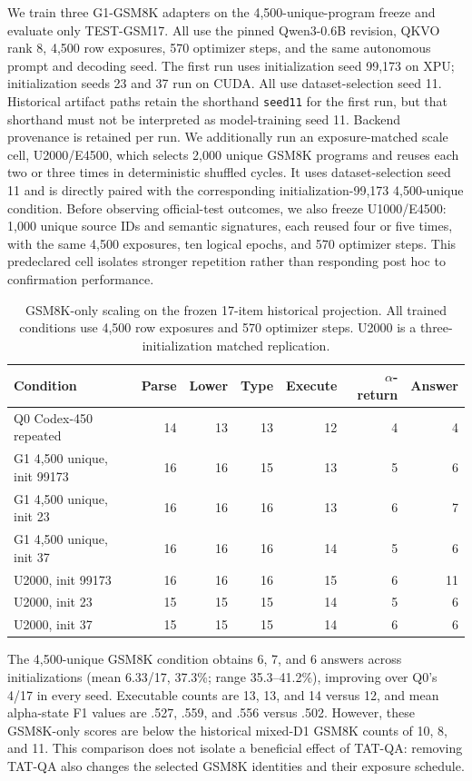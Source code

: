 \documentclass[11pt]{article}
\begin{document}
We train three G1-GSM8K adapters on the 4,500-unique-program freeze
and evaluate only TEST-GSM17. All use the pinned Qwen3-0.6B revision,
QKVO rank 8, 4,500 row exposures, 570 optimizer steps, and the same autonomous
prompt and decoding seed. The first run uses initialization seed 99,173 on XPU;
initialization seeds 23 and 37 run on CUDA. All use dataset-selection seed 11.
Historical artifact paths retain the shorthand \texttt{seed11} for the first
run, but that shorthand must not be interpreted as model-training seed 11.
Backend provenance is retained per run. We additionally run an exposure-matched
scale cell, U2000/E4500, which selects 2,000 unique GSM8K programs and
reuses each two or three times in deterministic shuffled cycles. It uses
dataset-selection seed 11 and is directly paired with the corresponding
initialization-99,173 4,500-unique condition.
Before observing official-test outcomes, we also freeze U1000/E4500: 1,000
unique source IDs and semantic signatures, each reused four or five times, with
the same 4,500 exposures, ten logical epochs, and 570 optimizer steps. This
predeclared cell isolates stronger repetition rather than responding post hoc
to confirmation performance.

\begin{table}[t]
\centering\small
\caption{GSM8K-only scaling on the frozen 17-item historical projection. All
trained conditions use 4,500 row exposures and 570 optimizer steps. U2000 is a
three-initialization matched replication.}
\label{tab:gsm8k-only-scale}
\begin{tabular}{lrrrrrr}
\toprule
Condition & Parse & Lower & Type & Execute & $\alpha$-return & Answer\\
\midrule
Q0 Codex-450 repeated & 14 & 13 & 13 & 12 & 4 & 4\\
G1 4,500 unique, init 99173 & 16 & 16 & 15 & 13 & 5 & 6\\
G1 4,500 unique, init 23 & 16 & 16 & 16 & 13 & 6 & 7\\
G1 4,500 unique, init 37 & 16 & 16 & 16 & 14 & 5 & 6\\
U2000, init 99173 & 16 & 16 & 16 & 15 & 6 & 11\\
U2000, init 23 & 15 & 15 & 15 & 14 & 5 & 6\\
U2000, init 37 & 15 & 15 & 15 & 14 & 6 & 6\\
\bottomrule
\end{tabular}
\end{table}

The 4,500-unique GSM8K condition obtains 6, 7, and 6 answers across initializations
(mean 6.33/17, 37.3\%; range 35.3--41.2\%), improving over Q0's 4/17 in every
seed. Executable counts are 13, 13, and 14 versus 12, and mean alpha-state F1
values are .527, .559, and .556 versus .502. However, these GSM8K-only scores
are below the historical mixed-D1 GSM8K counts of 10, 8, and 11. This comparison
does not isolate a beneficial effect of TAT-QA: removing TAT-QA also changes the
selected GSM8K identities and their exposure schedule.
\end{document}
